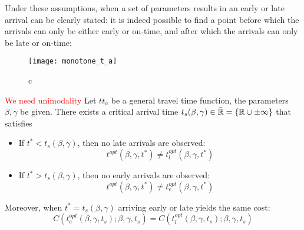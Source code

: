 Under these assumptions, when a set of parameters results in an early or late arrival can be clearly stated:
it is indeed possible to find a point before which the arrivals can only be either early or on-time,
and after which the arrivals can only be late or on-time:

\begin{figure}
  \centering
  \texttt{[image: monotone\_t\_a]}
  \caption{c}
  \label{fig:monotone-t_a}
\end{figure}

\begin{prop}
  \label{prop:split-early-late}
  \textcolor{red}{We need unimodality}
  Let \(tt_a\) be a general travel time function, the parameters \(\beta, \gamma\) be given.
  There exists a critical arrival time \(t_s(\beta, \gamma) \in \bar{\mathbb{R}} = \{\mathbb{R} \cup \pm \infty\}\) that satisfies
  \begin{itemize}
  \item If \(t^* < t_s(\beta, \gamma)\), then no late arrivals are observed:
    \begin{equation*}
      t^{opt}(\beta, \gamma, t^*) \neq t_l^{opt}(\beta, \gamma, t^*)
    \end{equation*}
  \item If \(t^* > t_s(\beta, \gamma)\), then no early arrivals are observed:
    \begin{equation*}
      t^{opt}(\beta, \gamma, t^*) \neq t_e^{opt}(\beta, \gamma, t^*)
    \end{equation*}
  \end{itemize}

  Moreover, when \(t^* = t_s(\beta, \gamma)\) arriving early or late yields the same cost:
  \begin{equation*}
    C(t_e^{opt}(\beta, \gamma, t_s); \beta, \gamma, t_s) = C(t_l^{opt}(\beta, \gamma, t_s); \beta, \gamma, t_s)
  \end{equation*}
\end{prop}
